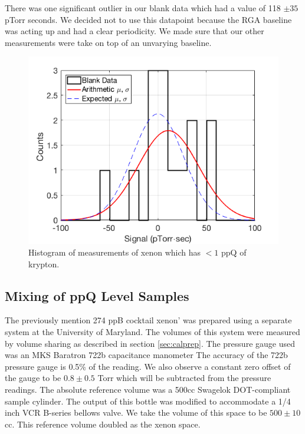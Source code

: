 There was one significant outlier in our blank data which had a value of 118 $\pm35$ pTorr seconds. We decided not to use this datapoint because the RGA baseline was acting up and had a clear periodicity. We made sure that our other measurements were take on top of an unvarying baseline.
\begin{figure}[h!]
  \includegraphics[width=\linewidth]{Figures/BlankHist0217.png}
  \caption{Histogram of measurements of xenon which has $<1$ ppQ of  krypton.}
  \label{fig:senstrace}
\end{figure}


\subsection{Mixing of ppQ Level Samples}\label{sec:ppqprep}
The previously mention 274 ppB cocktail xenon' was prepared using a separate system at the University of Maryland. The volumes of this system were measured by volume sharing as described in section \ref{sec:calprep}. The pressure gauge used was an MKS Baratron 722b capacitance manometer The accuracy of the 722b pressure gauge is 0.5\% of the reading. We also observe a constant zero offset of the gauge to be $0.8\pm0.5$ Torr which will be subtracted from the pressure readings. The absolute reference volume was a 500cc Swagelok DOT-compliant sample cylinder. The output of this bottle was modified to accommodate a 1/4 inch VCR B-series bellows valve. We take the volume of this space to be $500 \pm10$cc. This reference volume doubled as the xenon space. 

